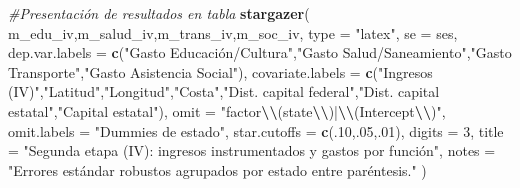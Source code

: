 \documentclass[
]{article}
\newenvironment{Shaded}{\begin{snugshade}}{\end{snugshade}}
\newcommand{\AttributeTok}[1]{\textcolor[rgb]{0.13,0.29,0.53}{#1}}
\newcommand{\CommentTok}[1]{\textcolor[rgb]{0.56,0.35,0.01}{\textit{#1}}}
\newcommand{\DecValTok}[1]{\textcolor[rgb]{0.00,0.00,0.81}{#1}}
\newcommand{\FunctionTok}[1]{\textcolor[rgb]{0.13,0.29,0.53}{\textbf{#1}}}
\newcommand{\NormalTok}[1]{#1}
\newcommand{\SpecialCharTok}[1]{\textcolor[rgb]{0.81,0.36,0.00}{\textbf{#1}}}
\newcommand{\StringTok}[1]{\textcolor[rgb]{0.31,0.60,0.02}{#1}}
\begin{document}
\begin{Shaded}
\begin{Highlighting}[]
\CommentTok{\#Presentación de resultados en tabla}
\FunctionTok{stargazer}\NormalTok{(}
\NormalTok{  m\_edu\_iv,m\_salud\_iv,m\_trans\_iv,m\_soc\_iv,}
  \AttributeTok{type =} \StringTok{"latex"}\NormalTok{, }\AttributeTok{se =}\NormalTok{ ses,}
  \AttributeTok{dep.var.labels =} \FunctionTok{c}\NormalTok{(}\StringTok{"Gasto Educación/Cultura"}\NormalTok{,}\StringTok{"Gasto Salud/Saneamiento"}\NormalTok{,}\StringTok{"Gasto Transporte"}\NormalTok{,}\StringTok{"Gasto Asistencia Social"}\NormalTok{),}
  \AttributeTok{covariate.labels =} \FunctionTok{c}\NormalTok{(}\StringTok{"Ingresos (IV)"}\NormalTok{,}\StringTok{"Latitud"}\NormalTok{,}\StringTok{"Longitud"}\NormalTok{,}\StringTok{"Costa"}\NormalTok{,}\StringTok{"Dist. capital federal"}\NormalTok{,}\StringTok{"Dist. capital estatal"}\NormalTok{,}\StringTok{"Capital estatal"}\NormalTok{),}
  \AttributeTok{omit =} \StringTok{"factor}\SpecialCharTok{\textbackslash{}\textbackslash{}}\StringTok{(state}\SpecialCharTok{\textbackslash{}\textbackslash{}}\StringTok{)|}\SpecialCharTok{\textbackslash{}\textbackslash{}}\StringTok{(Intercept}\SpecialCharTok{\textbackslash{}\textbackslash{}}\StringTok{)"}\NormalTok{, }\AttributeTok{omit.labels =} \StringTok{"Dummies de estado"}\NormalTok{,}
  \AttributeTok{star.cutoffs =} \FunctionTok{c}\NormalTok{(.}\DecValTok{10}\NormalTok{,.}\DecValTok{05}\NormalTok{,.}\DecValTok{01}\NormalTok{), }\AttributeTok{digits =} \DecValTok{3}\NormalTok{,}
  \AttributeTok{title =} \StringTok{"Segunda etapa (IV): ingresos instrumentados y gastos por función"}\NormalTok{,}
  \AttributeTok{notes =} \StringTok{"Errores estándar robustos agrupados por estado entre paréntesis."}
\NormalTok{)}
\end{Highlighting}
\end{Shaded}
\end{document}
